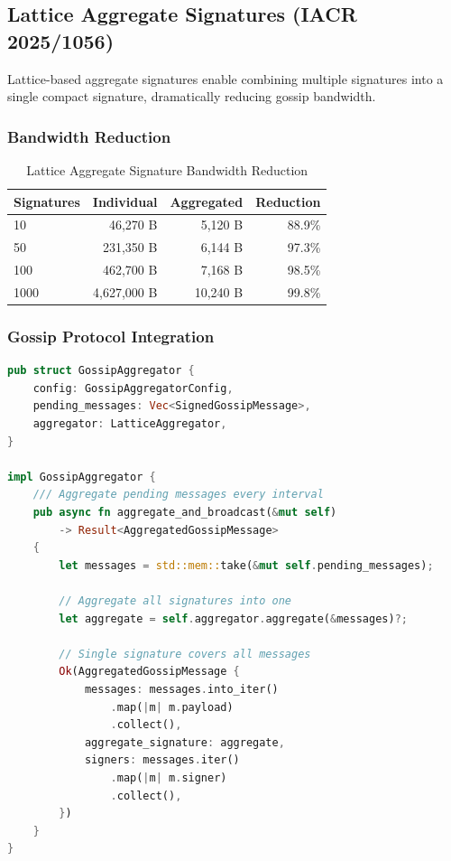 \documentclass[11pt,a4paper]{article}
\begin{document}
\subsection{Lattice Aggregate Signatures (IACR 2025/1056)}

Lattice-based aggregate signatures enable combining multiple signatures into a single compact signature, dramatically reducing gossip bandwidth.

\subsubsection{Bandwidth Reduction}

\begin{table}[h]
\centering
\begin{tabular}{lrrr}
\toprule
\textbf{Signatures} & \textbf{Individual} & \textbf{Aggregated} & \textbf{Reduction} \\
\midrule
10 & 46,270 B & 5,120 B & 88.9\% \\
50 & 231,350 B & 6,144 B & 97.3\% \\
100 & 462,700 B & 7,168 B & 98.5\% \\
1000 & 4,627,000 B & 10,240 B & 99.8\% \\
\bottomrule
\end{tabular}
\caption{Lattice Aggregate Signature Bandwidth Reduction}
\end{table}

\subsubsection{Gossip Protocol Integration}

\begin{lstlisting}[language=Rust, caption=Lattice Gossip Aggregator]
pub struct GossipAggregator {
    config: GossipAggregatorConfig,
    pending_messages: Vec<SignedGossipMessage>,
    aggregator: LatticeAggregator,
}

impl GossipAggregator {
    /// Aggregate pending messages every interval
    pub async fn aggregate_and_broadcast(&mut self)
        -> Result<AggregatedGossipMessage>
    {
        let messages = std::mem::take(&mut self.pending_messages);

        // Aggregate all signatures into one
        let aggregate = self.aggregator.aggregate(&messages)?;

        // Single signature covers all messages
        Ok(AggregatedGossipMessage {
            messages: messages.into_iter()
                .map(|m| m.payload)
                .collect(),
            aggregate_signature: aggregate,
            signers: messages.iter()
                .map(|m| m.signer)
                .collect(),
        })
    }
}
\end{lstlisting}
\end{document}
